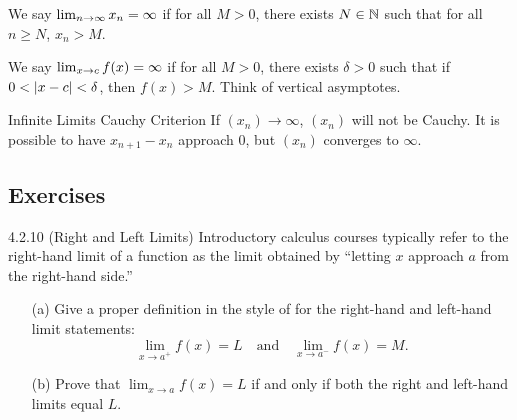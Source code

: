 We say \(\lim_{n \rightarrow \infty}x_n = \infty\) if for all \(M > 0\), there exists \(N \in \mathbb{N}\) such that for all \(n \geq N\), \(x_n > M\).

We say \(\lim_{x \rightarrow c}f(x) = \infty\) if for all \(M > 0\), there exists \(\delta > 0\) such that if \(0 < \left|x - c\right| < \delta\), then \(f(x) > M\). Think of vertical asymptotes.


\begin{ntheorem}
    {Infinite Limits Cauchy Criterion} If \((x_n) \rightarrow \infty\), \((x_n)\) will not be Cauchy. It is possible to have \(x_{n+1} - x_n\) approach 0, but \((x_n)\) converges to \(\infty\).
\end{ntheorem}


\renewcommand{\theenumi}{\alph{enumi}}
\renewcommand{\labelenumi}{(\theenumi)}
\subsection{Exercises}

\begin{exercise}
    {4.2.10 (Right and Left Limits)} Introductory calculus courses typically refer to the right-hand limit of a function as the limit obtained by “letting \(x\) approach \(a\) from the right-hand side.”
    \begin{enumerate}
        \item[(a)] Give a proper definition in the style of  for the right-hand and left-hand limit statements:
              \[
                  \lim_{x \to a^+} f(x) = L \quad \text{and} \quad \lim_{x \to a^-} f(x) = M.
              \]

        \item[(b)] Prove that \(\lim_{x \to a} f(x) = L\) if and only if both the right and left-hand limits equal \(L\).
    \end{enumerate}
\end{exercise}

